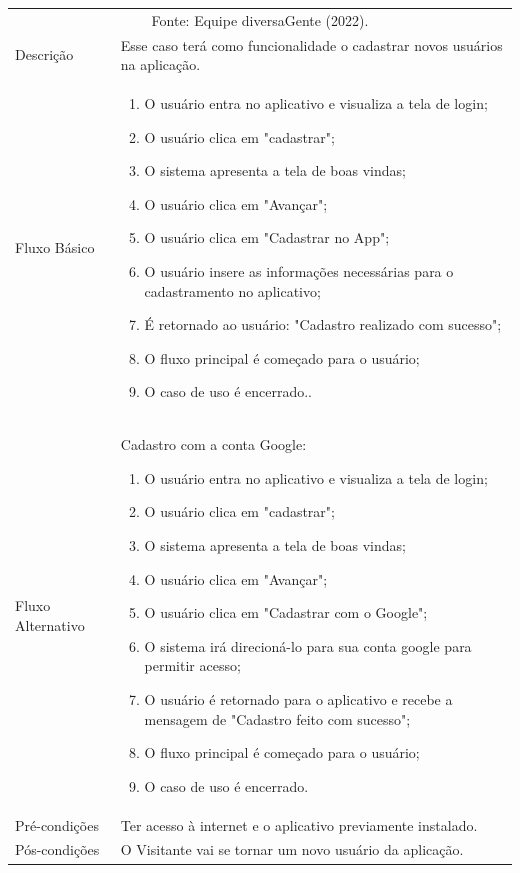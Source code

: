 \begin{apendicesenv}
\begin{quadro}[htb]
	\centering
	\ABNTEXfontereduzida
	\caption[Caso de Uso Efetuar Cadastro]{Caso de Uso Efetuar Cadastro}
	\label{casos-de-uso2}
\end{quadro}
\begin{longtable}{|p{3.3cm}|p{12.3cm}|}
	\hline
	\thead{} & \thead{Ator} \\
	\hline
		\endfirsthead
	\multicolumn{2}{c}{\scriptsize Fonte: Equipe diversaGente (2022).}%
	{{ \autoref{casos-de-uso2} continued from previous page}} \\
	\endhead
	Descrição & Esse caso terá como funcionalidade o cadastrar novos usuários na aplicação.\\
	\hline
	Fluxo Básico  & 
	\begin{enumerate}
		\item O usuário entra no aplicativo e visualiza a tela de login;
		\item O usuário clica em "cadastrar";
		\item O sistema apresenta a tela de boas vindas;
		\item O usuário clica em "Avançar";
		\item O usuário clica em "Cadastrar no App";
		\item O usuário insere as informações necessárias para o cadastramento no aplicativo;
		\item É retornado ao usuário: "Cadastro realizado com sucesso";
		\item O fluxo principal é começado para o usuário;
		\item O caso de uso é encerrado.. 
	\end{enumerate}\\
	\hline
	Fluxo Alternativo  & Cadastro com a conta Google:
	\begin{enumerate}
		\item O usuário entra no aplicativo e visualiza a tela de login;
		\item O usuário clica em "cadastrar";
		\item O sistema apresenta a tela de boas vindas;
		\item O usuário clica em "Avançar";
		\item O usuário clica em "Cadastrar com o Google";
		\item O sistema irá direcioná-lo para sua conta google para permitir acesso;
		\item O usuário é retornado para o aplicativo e recebe a mensagem de "Cadastro feito com sucesso";
		\item  O fluxo principal é começado para o usuário;
		\item O caso de uso é encerrado.
	\end{enumerate}\\
	\hline
	Pré-condições & Ter acesso à internet e o aplicativo previamente instalado.\\
	\hline
	Pós-condições & O Visitante vai se tornar um novo usuário da aplicação.\\
	\hline
\end{longtable}


\end{apendicesenv}
